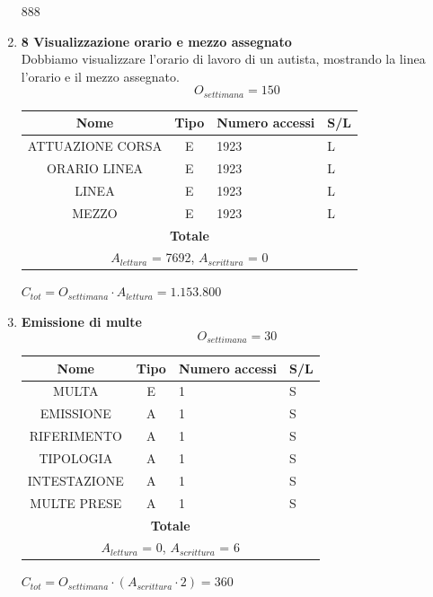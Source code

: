 \documentclass[12pt,a4paper]{report}
\begin{document}
\begin{enumerate}[label=\textbf{\arabic*)}]
888
\item \textbf{8 Visualizzazione orario e mezzo assegnato} \\
    Dobbiamo visualizzare l'orario di lavoro di un autista, mostrando la linea l'orario e il mezzo assegnato.
    \[ {O_{settimana} = 150} \]
    \begin{table}[H]
    \centering
    \begin{tabular}{|c|c|l|l|}
    \hline
    \textbf{Nome} & \textbf{Tipo} & \textbf{Numero accessi} & \textbf{S/L} \\
    \hline
    ATTUAZIONE CORSA & E & 1923 & L \\ 
    \hline
    ORARIO LINEA & E & 1923 & L \\ 
    \hline
    LINEA & E & 1923 & L \\
    \hline
    MEZZO & E & 1923 & L \\
    \hline
    \multicolumn{4}{c}{\textbf{Totale}} \\    
    \multicolumn{4}{c}{${A_{lettura}}$ = 7692, ${A_{scrittura}}$ = 0} \\
    \hline
    \end{tabular}
    \end{table}
    \begin{center}
    ${C_{tot} = {O_{settimana}}\cdot {A_{lettura}} =1.153.800}$
    \end{center}

    \item \textbf{Emissione di multe} \\
    \[ {O_{settimana} = 30} \]
    \begin{table}[H]
    \centering
    \begin{tabular}{|c|c|l|l|}
    \hline
    \textbf{Nome} & \textbf{Tipo} & \textbf{Numero accessi} & \textbf{S/L} \\
    \hline
    MULTA & E & 1 & S \\
    \hline
    EMISSIONE & A & 1 & S \\
    \hline
    RIFERIMENTO & A & 1 & S \\
    \hline
    TIPOLOGIA & A & 1 & S \\
    \hline
    INTESTAZIONE & A & 1 & S \\
    \hline
    MULTE PRESE & A & 1 & S \\
    \hline
    \multicolumn{4}{c}{\textbf{Totale}} \\    
    \multicolumn{4}{c}{${A_{lettura}}$ = 0, ${A_{scrittura}}$ = 6} \\
    \hline
    \end{tabular}
    \end{table}
    \begin{center}
    ${C_{tot} = {O_{settimana}}\cdot({A_{scrittura}}\cdot 2) = 360}$
    \end{center}


\end{enumerate}
\end{document}
